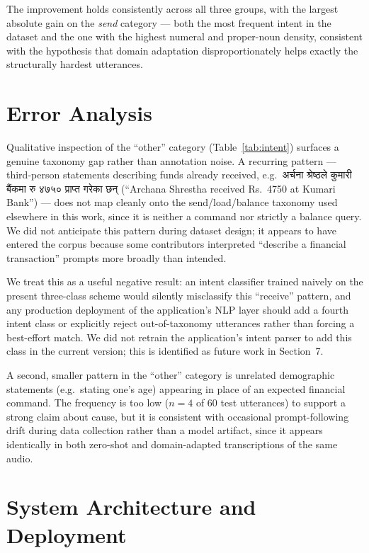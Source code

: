 \documentclass[11pt,a4paper]{article}
\newcommand{\dev}[1]{{\devfont #1}}
\begin{document}
The improvement holds consistently across all three groups, with the
largest absolute gain on the \textit{send} category --- both the most
frequent intent in the dataset and the one with the highest numeral and
proper-noun density, consistent with the hypothesis that domain adaptation
disproportionately helps exactly the structurally hardest utterances.

\section{Error Analysis}

Qualitative inspection of the ``other'' category (Table~\ref{tab:intent})
surfaces a genuine taxonomy gap rather than annotation noise. A recurring
pattern --- third-person statements describing funds already received,
e.g.\ \dev{अर्चना श्रेष्ठले कुमारी बैंकमा रु ४७५० प्राप्त गरेका छन्} (``Archana
Shrestha received Rs.\ 4750 at Kumari Bank'') --- does not map cleanly onto
the send/load/balance taxonomy used elsewhere in this work, since it is
neither a command nor strictly a balance query. We did not anticipate this
pattern during dataset design; it appears to have entered the corpus
because some contributors interpreted ``describe a financial transaction''
prompts more broadly than intended.

We treat this as a useful negative result: an intent classifier trained
naively on the present three-class scheme would silently misclassify this
``receive'' pattern, and any production deployment of the application's
NLP layer should add a fourth intent class or explicitly reject
out-of-taxonomy utterances rather than forcing a best-effort match. We did
not retrain the application's intent parser to add this class in the
current version; this is identified as future work in Section~7.

A second, smaller pattern in the ``other'' category is unrelated
demographic statements (e.g.\ stating one's age) appearing in place of an
expected financial command. The frequency is too low ($n=4$ of 60 test
utterances) to support a strong claim about cause, but it is consistent
with occasional prompt-following drift during data collection rather than
a model artifact, since it appears identically in both zero-shot and
domain-adapted transcriptions of the same audio.

\section{System Architecture and Deployment}
\end{document}
